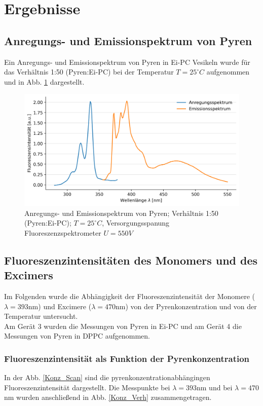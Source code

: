 \section{Ergebnisse}
\subsection{Anregungs- und Emissionspektrum von Pyren}
Ein Anregungs- und Emissionspektrum von Pyren in Ei-PC Vesikeln wurde für das Verhältnis 1:50 (Pyren:Ei-PC) bei der Temperatur $T=25^\circ C$ aufgenommen und in Abb. \ref{Em_Ex_Scan} dargestellt.
\begin{figure}[h!]
	\begin{center}
		\begin{minipage}{0,8\textwidth}
			
			\includegraphics[width=\textwidth]{picture/Em_Ex_Scan_50.png}
			\caption{Anregungs- und Emissionspektrum von Pyren; Verhältnis 1:50 (Pyren:Ei-PC); $T=25^\circ C$, Versorgungsspanung Fluoreszenzspektrometer $U=550V$} 
			\label{Em_Ex_Scan} 
		\end{minipage}
	\end{center}
\end{figure}

\subsection{Fluoreszenzintensitäten des Monomers und des Excimers}
Im Folgenden wurde die Abhängigkeit der Fluoreszenzintensität der Monomere  ($\lambda=393$nm) und Excimere ($\lambda=470$nm) von der Pyrenkonzentration und von der Temperatur untersucht.\\
Am Gerät 3 wurden die Messungen von Pyren in Ei-PC und am Gerät 4 die Messungen von Pyren in DPPC aufgenommen.

\subsubsection{Fluoreszenzintensität als Funktion der Pyrenkonzentration}\label{sec:F_von_C}
In der Abb. \ref{Konz_Scan} sind die pyrenkonzentrationabhängingen Fluoreszenzintensität dargestellt. Die Messpunkte bei $\lambda=393$nm und bei $\lambda=470$nm wurden anschließend in Abb. \ref{Konz_Verh} zusammengetragen.

